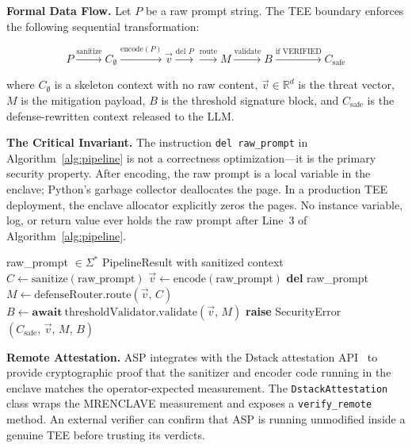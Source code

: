 \documentclass[sigconf,natbib=false]{acmart}
\begin{document}
\textbf{Formal Data Flow.}
Let $P$ be a raw prompt string. The TEE boundary enforces the following
sequential transformation:

\begin{equation}
\label{eq:pipeline}
P \xrightarrow{\text{sanitize}} C_{\emptyset}
  \xrightarrow{\text{encode}(P)} \vec{v}
  \xrightarrow{\text{del } P}
  \xrightarrow{\text{route}} M
  \xrightarrow{\text{validate}} B
  \xrightarrow{\text{if VERIFIED}} C_{\text{safe}}
\end{equation}

where $C_{\emptyset}$ is a skeleton context with no raw content,
$\vec{v} \in \mathbb{R}^d$ is the threat vector,
$M$ is the mitigation payload,
$B$ is the threshold signature block, and
$C_{\text{safe}}$ is the defense-rewritten context released to the LLM.

\textbf{The Critical Invariant.}
The instruction \texttt{del raw\_prompt} in Algorithm~\ref{alg:pipeline}
is not a correctness optimization—it is the primary security property.
After encoding, the raw prompt is a local variable in the enclave; Python's
garbage collector deallocates the page. In a production TEE deployment,
the enclave allocator explicitly zeros the pages. No instance variable,
log, or return value ever holds the raw prompt after Line~3 of
Algorithm~\ref{alg:pipeline}.

\begin{algorithm}[t]
\caption{TEE Boundary: process(raw\_prompt)}
\label{alg:pipeline}
\begin{algorithmic}[1]
\Require raw\_prompt $\in \Sigma^*$
\Ensure PipelineResult with sanitized context
\Try
\State $C \gets \text{sanitize}(\text{raw\_prompt})$
\State $\vec{v} \gets \text{encode}(\text{raw\_prompt})$
\Finally
\State \textbf{del} raw\_prompt
\EndTry
\State $M \gets \text{defenseRouter.route}(\vec{v},\, C)$
\State $B \gets \textbf{await}~\text{thresholdValidator.validate}(\vec{v},\, M)$
  \State \textbf{raise} SecurityError
\EndIf
\Return $(C_\text{safe},\, \vec{v},\, M,\, B)$
\end{algorithmic}
\end{algorithm}

\textbf{Remote Attestation.}
ASP integrates with the Dstack attestation API~\cite{dstack2024} to provide
cryptographic proof that the sanitizer and encoder code running in the enclave
matches the operator-expected measurement. The \texttt{DstackAttestation}
class wraps the MRENCLAVE measurement and exposes a \texttt{verify\_remote}
method. An external verifier can confirm that ASP is running unmodified inside
a genuine TEE before trusting its verdicts.
\end{document}
